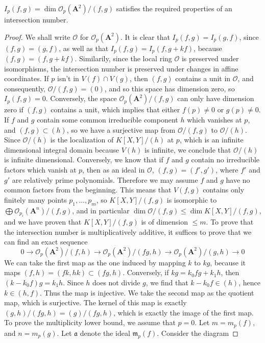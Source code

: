 \begin{theorem}
    $I_p(f,g) = \dim \mathcal{O}_p(\mathbf{A}^2)/(f,g)$ satisfies the required properties of an intersection number.
\end{theorem}
\begin{proof}
    We shall write $\mathcal{O}$ for $\mathcal{O}_p(\mathbf{A}^2)$. It is clear that $I_p(f,g) = I_p(g,f)$, since $(f,g) = (g,f)$, as well as that $I_p(f,g) = I_p(f,g + kf)$, because $(f,g) = (f,g + kf)$. Similarily, since the local ring $\mathcal{O}$ is preserved under isomorphisms, the intersection number is preserved under changes in affine coordinates. If $p$ isn't in $V(f) \cap V(g)$, then $(f,g)$ contains a unit in $\mathcal{O}$, and consequently, $\mathcal{O}/(f,g) = (0)$, and so this space has dimension zero, so $I_p(f,g) = 0$. Conversely, the space $\mathcal{O}_p(\mathbf{A}^2)/(f,g)$ can only have dimension zero if $(f,g)$ contains a unit, which implies that either $f(p) \neq 0$ or $g(p) \neq 0$. If $f$ and $g$ contain some common irreducible component $h$ which vanishes at $p$, and $(f,g) \subset (h)$, so we have a surjective map from $\mathcal{O}/(f,g)$ to $\mathcal{O}/(h)$. Since $\mathcal{O}/(h)$ is the localization of $K[X,Y]/(h)$ at $p$, which is an infinite dimensional integral domain because $V(h)$ is infinite, we conclude that $\mathcal{O}/(h)$ is infinite dimensional. Conversely, we know that if $f$ and $g$ contain no irreducible factors which vanish at $p$, then as an ideal in $\mathcal{O}$, $(f,g) = (f',g')$, where $f'$ and $g'$ are relatively prime polynomials. Therefore we may assume $f$ and $g$ have no common factors from the beginning. This means that $V(f,g)$ contains only finitely many points $p_1, \dots, p_m$, so $K[X,Y]/(f,g)$ is isomorphic to $\bigoplus \mathcal{O}_{p_i}(\mathbf{A}^n)/(f,g)$, and in particular $\dim \mathcal{O}/(f,g) \leq \dim K[X,Y]/(f,g)$, and we have proven that $K[X,Y]/(f,g)$ is of dimension $\leq m$. To prove that the intersection number is multiplicatively additive, it suffices to prove that we can find an exact sequence
    \[ 0 \to \mathcal{O}_p(\mathbf{A}^2)/(f,h) \to \mathcal{O}_p(\mathbf{A}^2)/(fg,h) \to \mathcal{O}_p(\mathbf{A}^2)/(g,h) \to 0 \]
    We can take the first map as the one induced by mapping $k$ to $kg$, because it maps $(f,h) = (fk,hk) \subset (fg,h)$. Conversely, if $kg = k_0fg + k_1h$, then $(k - k_0f)g = k_1h$. Since $h$ does not divide $g$, we find that $k - k_0f \in (h)$, hence $k \in (h,f)$. Thus the map is injective. We take the second map as the quotient map, which is surjective. The kernel of this map is exactly $(g,h)/(fg,h) = (g)/(fg,h)$, which is exactly the image of the first map. To prove the multiplicity lower bound, we assume that $p = 0$. Let $m = m_p(f)$, and $n = m_p(g)$. Let $\mathfrak{a}$ denote the ideal $\mathfrak{m}_p(f)$. Consider the diagram

\end{proof}
